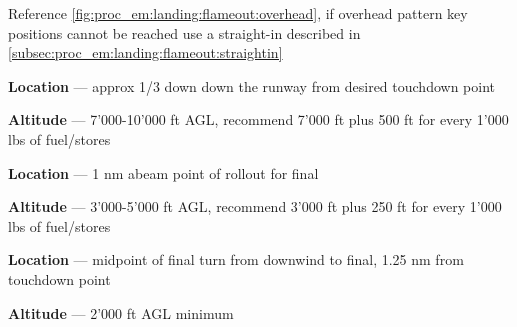 \begin{tcoloritemize}
    Reference \cref{fig:proc_em:landing:flameout:overhead}, 
    if overhead pattern key positions cannot be reached use a straight-in 
    described in \cref{subsec:proc_em:landing:flameout:straightin}

    \textbf{Location} --- approx {1/3 down down the runway} from desired touchdown point

    \bigskip
    \textbf{Altitude} --- {7'000-10'000 ft AGL},
    recommend 7'000 ft plus 500 ft for every 1'000 lbs of fuel/stores

    \textbf{Location} --- {1 nm abeam} point of rollout for final 

    \bigskip
    \textbf{Altitude} --- {3'000-5'000 ft AGL},
    recommend 3'000 ft plus 250 ft for every 1'000 lbs of fuel/stores

    \textbf{Location} --- midpoint of final turn from downwind to final,
    {1.25 nm from touchdown point}

    \bigskip
    \textbf{Altitude} --- {2'000 ft AGL minimum}
\end{tcoloritemize}



